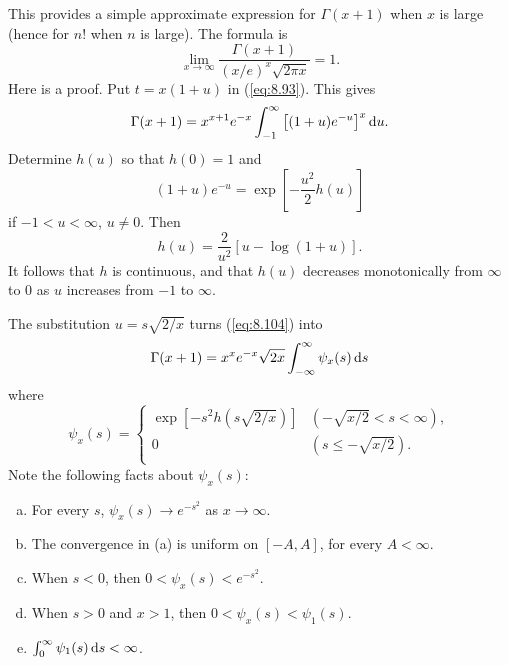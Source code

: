 \begin{thm}
    \label{thm:8.22}
    This provides a simple approximate expression for 
    $\Gamma(x + 1)$ when $x$ is large (hence for $n!$ when $n$ is large). 
    The formula is
    \begin{equation}
        \label{eq:8.103}
        \lim_{x \to \infty} \frac{\Gamma(x+1)}{(x/e)^{x}\sqrt{2\pi x}} = 1 .
    \end{equation}
    Here is a proof.
    Put $t=x(1+u)$ in (\ref{eq:8.93}).
    This gives 
    \begin{equation}
        \label{eq:8.104}
        \Gamma(x+1) = x^{x+1} e^{-x} 
        \int_{-1}^{\infty}
        \left[ (1+u)e^{-u} \right]^{x} \d u .
    \end{equation}
    Determine $h(u)$ so that $h(0)=1$ and 
    \begin{equation}
        \label{eq:8.105}
        (1+u)e^{-u}=\exp \left[ -\frac{u^2}{2}h(u) \right]
    \end{equation}
    if $-1<u<\infty$, $u \neq 0$.
    Then 
    \begin{equation}
        \label{eq:8.106}
        h(u) = \frac{2}{u^2} \left[ u - \log (1+u) \right].
    \end{equation}
    It follows that $h$ is continuous, 
    and that $h(u)$ decreases monotonically from $\infty$
    to $0$ as $u$ increases from $-1$ to $\infty$.

    The substitution $u=s\sqrt{2/x}$ turns (\ref{eq:8.104}) into 
    \begin{equation}
        \label{eq:8.107}
        \Gamma(x+1) = x^x e^{-x} \sqrt{2x} 
        \int_{-\infty}^{\infty} \psi_x(s) \d s
    \end{equation}
    where 
    \begin{equation*}
        \psi_x(s) = \left\{ 
            \begin{array}{ll}
                \exp \left[ -s^2 h (s\sqrt{2/x}) \right] & (-\sqrt{x/2}<s<\infty), \\
                0 & (s\leq -\sqrt{x/2}). \\
            \end{array}
        \right.
    \end{equation*}
    Note the following facts about $\psi_x(s)$:
    \begin{enumerate}[(a)]
        \item For every $s$, $\psi_x(s)\rightarrow e^{-s^2}$ as $x \rightarrow \infty$.
        \item The convergence in (a) is uniform on $[-A,A]$, for every $A<\infty$.
        \item When $s<0$, then $0<\psi_x(s)<e^{-s^2}$.
        \item When $s>0$ and $x>1$, then $0<\psi_x(s)<\psi_1(s)$.
        \item $\int_{0}^{\infty}\psi_1(s)\d s<\infty$.
    \end{enumerate}
\end{thm}

